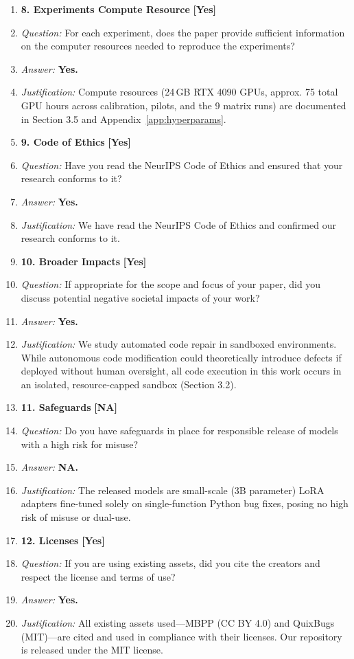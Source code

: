 \documentclass{article}
\begin{document}
\begin{enumerate}
\item[] \textbf{8. Experiments Compute Resource} \hfill \textbf{[Yes]}
\item[] \textit{Question:} For each experiment, does the paper provide sufficient information on the computer resources needed to reproduce the experiments?
\item[] \textit{Answer:} \textbf{Yes.}
\item[] \textit{Justification:} Compute resources (24\,GB RTX 4090 GPUs, approx. 75 total GPU hours across calibration, pilots, and the 9 matrix runs) are documented in Section 3.5 and Appendix~\ref{app:hyperparams}.

\item[] \textbf{9. Code of Ethics} \hfill \textbf{[Yes]}
\item[] \textit{Question:} Have you read the NeurIPS Code of Ethics and ensured that your research conforms to it?
\item[] \textit{Answer:} \textbf{Yes.}
\item[] \textit{Justification:} We have read the NeurIPS Code of Ethics and confirmed our research conforms to it.

\item[] \textbf{10. Broader Impacts} \hfill \textbf{[Yes]}
\item[] \textit{Question:} If appropriate for the scope and focus of your paper, did you discuss potential negative societal impacts of your work?
\item[] \textit{Answer:} \textbf{Yes.}
\item[] \textit{Justification:} We study automated code repair in sandboxed environments. While autonomous code modification could theoretically introduce defects if deployed without human oversight, all code execution in this work occurs in an isolated, resource-capped sandbox (Section 3.2).

\item[] \textbf{11. Safeguards} \hfill \textbf{[NA]}
\item[] \textit{Question:} Do you have safeguards in place for responsible release of models with a high risk for misuse?
\item[] \textit{Answer:} \textbf{NA.}
\item[] \textit{Justification:} The released models are small-scale (3B parameter) LoRA adapters fine-tuned solely on single-function Python bug fixes, posing no high risk of misuse or dual-use.

\item[] \textbf{12. Licenses} \hfill \textbf{[Yes]}
\item[] \textit{Question:} If you are using existing assets, did you cite the creators and respect the license and terms of use?
\item[] \textit{Answer:} \textbf{Yes.}
\item[] \textit{Justification:} All existing assets used—MBPP (CC BY 4.0) and QuixBugs (MIT)—are cited and used in compliance with their licenses. Our repository is released under the MIT license.


\end{enumerate}
\end{document}
